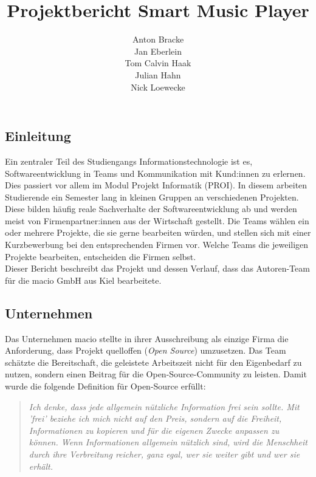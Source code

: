 \documentclass[10pt, a4paper]{article}
\title{Projektbericht Smart Music Player}
\author{Anton Bracke\\Jan Eberlein\\Tom Calvin Haak\\Julian Hahn\\Nick Loewecke}
\begin{document}
\begin{onehalfspace}
\maketitle
\newpage
\tableofcontents
\newpage




\section{Einleitung}
Ein zentraler Teil des Studiengangs \glqq Informationstechnologie\grqq{} ist es, Softwareentwicklung in Teams und Kommunikation mit Kund:innen zu erlernen. \cite{Qualifikationsziele_Informationstechnologie}
Dies passiert vor allem im Modul \glqq Projekt Informatik (PROI)\grqq{}.
In diesem arbeiten Studierende ein Semester lang in kleinen Gruppen an verschiedenen Projekten.
Diese bilden häufig reale Sachverhalte der Softwareentwicklung ab und werden meist von Firmenpartner:innen aus der Wirtschaft gestellt.
Die Teams wählen ein oder mehrere Projekte, die sie gerne bearbeiten würden, und stellen sich mit einer Kurzbewerbung bei den entsprechenden Firmen vor.
Welche Teams die jeweiligen Projekte bearbeiten, entscheiden die Firmen selbst.
\\
Dieser Bericht beschreibt das Projekt und dessen Verlauf, dass das Autoren-Team für die macio GmbH aus Kiel bearbeitete.

\subsection{Unternehmen}
Das Unternehmen macio stellte in ihrer Ausschreibung als einzige Firma die Anforderung, dass Projekt quelloffen (\textit{Open Source}) umzusetzen.
Das Team schätzte die Bereitschaft, die geleistete Arbeitszeit nicht für den Eigenbedarf zu nutzen, sondern einen Beitrag für die Open-Source-Community zu leisten.
Damit wurde die folgende Definition für Open-Source erfüllt:

\begin{quote}
  \textit{Ich denke, dass jede allgemein nützliche Information frei sein sollte.
  Mit 'frei' beziehe ich mich nicht auf den Preis, sondern auf die Freiheit, Informationen zu kopieren und für die eigenen Zwecke anpassen zu können.
  Wenn Informationen allgemein nützlich sind, wird die Menschheit durch ihre Verbreitung reicher, ganz egal, wer sie weiter gibt und wer sie erhält.}
  \cite{openSource}
\end{quote}


\end{onehalfspace}
\end{document}
